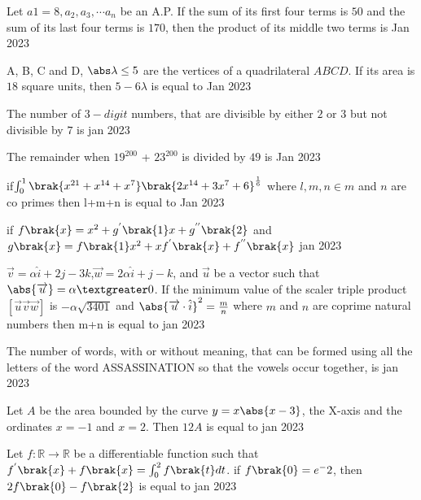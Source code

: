 \iffalse
\title{Assignment 3}
\author{AI24BTECH11018}
\section{integer}
\fi
\item Let $a1 = 8, a_2, a_3,\cdots  a_n$ be an A.P. If the sum of its 
first four terms is $50$ and the sum of its last four 
terms is $170$, then the product of its middle two 
terms is
\hfill{Jan 2023}
\item A, B, C and D, 
$\abs \lambda \leq 5$ are the vertices of a quadrilateral $ABCD$. If 
its area is $18$ square units, then $5-6\lambda$ is equal to
\hfill{Jan 2023}
\item The number of 
$3-digit$ numbers, that are divisible 
by either $2$ or $3$ but not divisible by $7$ is
\hfill{jan 2023}
\item The remainder when $19^{200}$ + $23^{200}$ is divided by $49$
is 
\hfill{Jan 2023}
\item if$\int_{0}^{1}\brak{x^{21}+x^{14}+x^7}\brak{2x^{14}+3x^{7}+6}^\frac{1}{6}$ where $l,m,n \in m$ and $n$ are co primes then l+m+n is equal to
\hfill{Jan 2023}
\item if $f\brak{x}=x^2+g^{'}\brak{1}x+g^{''}\brak{2}$ and $g\brak{x}=f\brak{1}x^2+xf^{'}\brak{x}+f^{''}\brak{x}$
\hfill{jan 2023}
\item $\overrightarrow{v}=\alpha \hat{i}+2j-3k$,$\overrightarrow{w}=2\alpha \hat{i}+j-k$, and $\overrightarrow{u}$ be a vector such that $\abs {\overrightarrow{u}}=\alpha  \textgreater 0$. If the minimum value of the scaler triple product $[\overrightarrow{u} \overrightarrow{v} \overrightarrow{w}]$ is $-\alpha \sqrt{3401}$ and $\abs {\overrightarrow{u}\cdot \hat{i}}^2=\frac{m}{n}$ where $m$ and $n$ are coprime natural numbers then m+n is equal to
\hfill{jan 2023}
\item The number of words, with or without meaning, 
that can be formed using all the letters of the word 
ASSASSINATION so that the vowels occur 
together, is
\hfill{jan 2023}
\item Let $A$ be the area bounded by the curve $y=x\abs {x-3}$, the X-axis and the ordinates $x=-1$ and $x=2$. Then $12A$ is equal to 
\hfill{jan 2023}
\item Let $f:\mathbb{R} \to \mathbb{R}$ be a differentiable function such that $f^{'}\brak{x}+f\brak{x}=\int_{0}^{2}f\brak{t}dt$. if $f\brak{0}=e^-2$, then $2f\brak{0}-f\brak{2}$ is equal to
\hfill{jan 2023}

%
